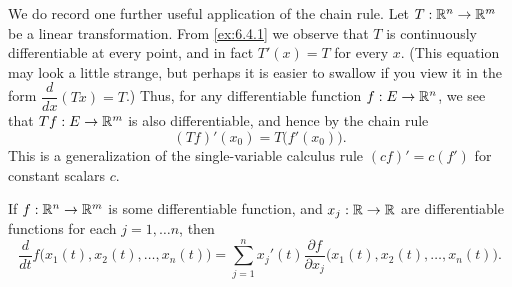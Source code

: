 \begin{note}
  We do record one further useful application of the chain rule.
  Let \(T : \mathbb{R}^n \to \mathbb{R}^m\) be a linear transformation.
  From \cref{ex:6.4.1} we observe that \(T\) is continuously differentiable at every point, and in fact \(T'(x) = T\) for every \(x\).
  (This equation may look a little strange, but perhaps it is easier to swallow if you view it in the form \(\dfrac{d}{dx} (Tx) = T\).)
  Thus, for any differentiable function \(f : E \to \mathbb{R}^n\), we see that \(T f : E \to \mathbb{R}^m\) is also differentiable, and hence by the chain rule
  \[
    (T f)'(x_0) = T\big(f'(x_0)\big).
  \]
  This is a generalization of the single-variable calculus rule \((cf)' = c(f')\) for constant scalars \(c\).
\end{note}

\begin{ac}\label{ac:6.4.1}
  If \(f : \mathbb{R}^n \to \mathbb{R}^m\) is some differentiable function, and \(x_j : \mathbb{R} \to \mathbb{R}\) are differentiable functions for each \(j = 1, \dots n\), then
  \[
    \dfrac{d}{dt} f\big(x_1(t), x_2(t), \dots, x_n(t)\big) = \sum_{j = 1}^n x_j'(t) \dfrac{\partial f}{\partial x_j} \big(x_1(t), x_2(t), \dots, x_n(t)\big).
  \]
\end{ac}

